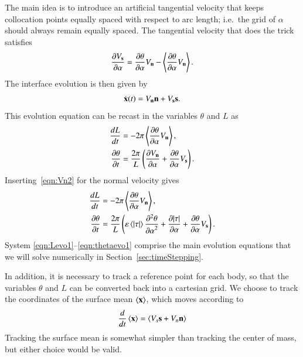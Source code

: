 \documentclass[preprint, 10pt]{elsarticle}
\begin{document}
The main idea is to introduce an artificial tangential velocity that
keeps collocation points equally spaced with respect to arc length;
i.e.~the grid of $\alpha$ should always remain equally spaced. The
tangential velocity that does the trick satisfies~\cite{hou-low-she1994}
\begin{align*}
\frac{\partial V_{\mathbf{s}}}{\partial \alpha} = \frac{\partial \theta}{\partial \alpha} V_{\mathbf{n}} - \left< \frac{\partial \theta}{\partial \alpha} V_{\mathbf{n}} \right>.
\end{align*}
The interface evolution is then given by
\begin{align*}
\dot{{\mathbf{x}}}(t) = V_{\mathbf{n}} {\mathbf{n}} + V_{\mathbf{s}} {\mathbf{s}}.
\end{align*}
This evolution equation can be recast in the variables $\theta$ and $L$
as
\begin{align*}
\frac{d L}{d t} &= - 2 \pi \left< \frac{\partial \theta}{\partial \alpha} V_{\mathbf{n}} \right>, \\
\frac{\partial \theta}{\partial t} &= \frac{2 \pi}{L} \left( \frac{\partial V_{\mathbf{n}}}{\partial \alpha} +
\frac{\partial \theta}{\partial \alpha} V_{\mathbf{s}} \right).
\end{align*}
Inserting~\eqref{eqn:Vn2} for the normal velocity gives
\begin{align}
\label{eqn:Levo1}
\frac{d L}{d t} &= - 2 \pi \left< \frac{\partial \theta}{\partial \alpha} V_{\mathbf{n}} \right>, \\
\label{eqn:thetaevo1}
\frac{\partial \theta}{\partial t} &= \frac{2\pi}{L} \left(
\varepsilon \left< \lvert \tau \rvert \right> \frac{\partial^2 \theta}{{\partial \alpha}^2} + \frac{\partial \lvert \tau \rvert}{\partial \alpha} +
\frac{\partial \theta}{\partial \alpha} V_{\mathbf{s}} \right).
\end{align}
System \eqref{eqn:Levo1}--\eqref{eqn:thetaevo1} comprise the main evolution equations that we will solve numerically in Section~\ref{sec:timeStepping}. 

In addition, it is necessary to track a reference point for each body, so that the variables $\theta$ and $L$ can be converted back into a cartesian grid. We choose to track the coordinates of the surface mean $\left< {\mathbf{x}} \right>$, which moves according to
\begin{align}
\label{eq:xsurf}
\frac{d}{dt} \left< {\mathbf{x}} \right> = \left<  V_s {\mathbf{s}} + V_n {\mathbf{n}}  \right>
\end{align}
Tracking the surface mean is somewhat simpler than tracking the center of mass, but either choice would be valid.


\end{document}
